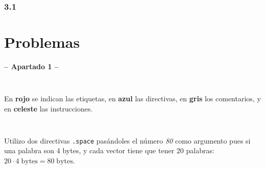 \documentclass[a4paper]{report}
\begin{document}
\subsection*{3.1}

\chapter{Problemas}

\begin{center}
    \Large\textbf{-- Apartado 1 --}
\end{center}

\section{}

\inputminted[linenos]{mips}{src/problemas/1.asm}

En \textcolor{autumn-red-pyg}{\textbf{rojo}} se indican las etiquetas, en \textcolor{autumn-blue-pyg}{\textbf{azul}} las directivas, en \textcolor{autumn-gray-pyg}{\textbf{gris}} los comentarios, y en \textcolor{autumn-teal-pyg}{\textbf{celeste}} las instrucciones.

\section{}

\inputminted[linenos]{mips}{src/problemas/2.asm}

Utilizo dos directivas \texttt{.space} pasándoles el número \textit{80} como argumento pues si una palabra son 4 bytes, y cada vector tiene que tener 20 palabras: $20 \cdot 4\;\text{bytes} = 80\;\text{bytes}$.

\section{}

\inputminted[linenos]{mips}{src/problemas/3.asm}


\section{}

\inputminted[linenos]{mips}{src/problemas/4.asm}


\section{}
\end{document}
